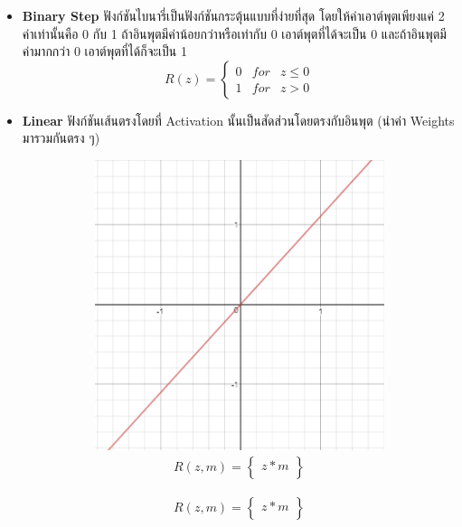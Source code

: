 \begin{itemize}
    \item \textbf{Binary Step} ฟังก์ชันไบนารี่เป็นฟังก์ชันกระตุ้นแบบที่ง่ายที่สุด โดยให้ค่าเอาต์พุตเพียงแค่ 2 ค่าเท่านั้นคือ 0 กับ 1
    ถ้าอินพุตมีค่าน้อยกว่าหรือเท่ากับ 0 เอาต์พุตที่ได้จะเป็น 0 และถ้าอินพุตมีค่ามากกว่า 0 เอาต์พุตที่ได้ก็จะเป็น 1
    \begin{equation}
        R(z) = \left\{
            \begin{array}{lll}
                0 & for & z \leq 0  \\
                1 & for & z > 0
            \end{array}
        \right.
    \end{equation}

    \item \textbf{Linear} ฟังก์ชันเส้นตรงโดยที่ Activation นั้นเป็นสัดส่วนโดยตรงกับอินพุต (นำค่า Weights มารวมกันตรง ๆ)
    \begin{figure}[htbp]
        \centering
        \begin{subfigure}{0.5\textwidth}
            \centering
            \includegraphics[width=0.9\linewidth]{fig/actfunc_linear.png}
            \caption{%
                \begin{equation}
                    \begin{split}R(z,m) = \begin{Bmatrix} z*m \\

\end{Bmatrix}
\end{split}
\end{equation}}
\end{subfigure}
\end{figure}
\end{itemize}
